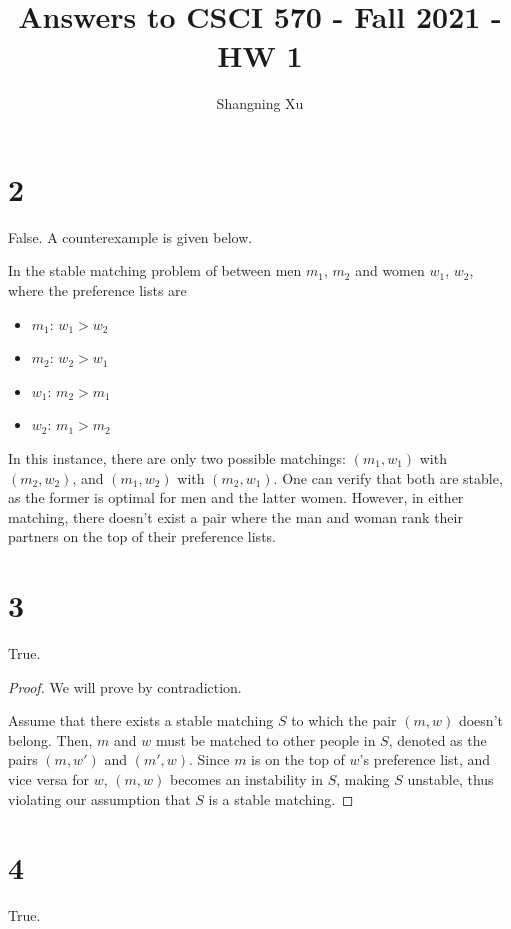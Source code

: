 \documentclass{article}
\title{Answers to CSCI 570 - Fall 2021 - HW 1}
\author{Shangning Xu}
\begin{document}
\maketitle

\section*{2}

False. A counterexample is given below.

In the stable matching problem of between men $m_1$, $m_2$ and women $w_1$, $w_2$, where the preference lists are

\begin{itemize}
    \item $m_1$: $w_1 > w_2$
    \item $m_2$: $w_2 > w_1$
    \item $w_1$: $m_2 > m_1$
    \item $w_2$: $m_1 > m_2$
\end{itemize}

In this instance, there are only two possible matchings: $(m_1, w_1)$ with $(m_2, w_2)$, and $(m_1, w_2)$ with $(m_2, w_1)$. One can verify that both are stable, as the former is optimal for men and the latter women. However, in either matching, there doesn't exist a pair where the man and woman rank their partners on the top of their preference lists.

\section*{3}

True.

\begin{proof}
    We will prove by contradiction.

    Assume that there exists a stable matching $S$ to which the pair $(m, w)$ doesn't belong. Then, $m$ and $w$ must be matched to other people in $S$, denoted as the pairs $(m, w')$ and $(m', w)$. Since $m$ is on the top of $w$'s preference list, and vice versa for $w$, $(m, w)$ becomes an instability in $S$, making $S$ unstable, thus violating our assumption that $S$ is a stable matching.
\end{proof}


\section*{4}

True.
\end{document}
